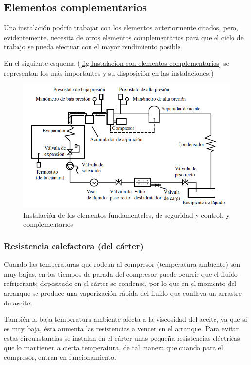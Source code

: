 \subsection{Elementos complementarios}
Una instalación podría trabajar con los elementos anteriormente citados, pero, evidentemente, necesita de otros elementos complementarios para que el ciclo de trabajo se pueda efectuar con el mayor rendimiento posible. 

En el siguiente esquema (\autoref{fig:Instalacion con elementos complementarios} se representan los más importantes y su disposición en las instalaciones.)

\begin{figure}[H]
	\centering
	\includegraphics[width=\textwidth]{figuras/Instalación con elementos complementarios.png}
	\caption{Instalación de los elementos fundamentales, de seguridad y control, y complementarios}
	\label{fig:Instalacion con elementos complementarios}
\end{figure}

\subsubsection{Resistencia calefactora (del cárter)}

Cuando las temperaturas que rodean al compresor (temperatura ambiente) son muy bajas, en los tiempos de parada del compresor puede ocurrir que el fluido refrigerante depositado en el cárter se condense, por lo que en el momento del arranque se produce una vaporización rápida del fluido que conlleva un arrastre de aceite.

También la baja temperatura ambiente afecta a la viscosidad del aceite, ya que si es muy baja, ésta aumenta las resistencias a vencer en el arranque. Para evitar estas circunstancias se instalan en el cárter unas peque\~{n}a resistencias eléctricas que lo mantienen a cierta temperatura, de tal manera que cuando para el compresor, entran en funcionamiento.

